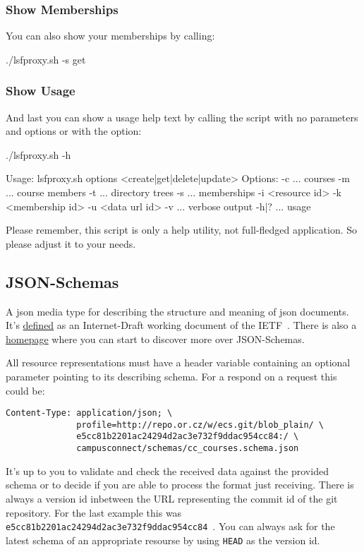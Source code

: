 \subsubsection{Show Memberships}
You can also show your memberships by calling:
\begin{code}
  ./lsfproxy.sh -s get
\end{code}

\subsubsection{Show Usage}
And last you can show a usage help text by calling the script with no
parameters and options or with the  option:
\begin{code}
  ./lsfproxy.sh -h

  Usage: lsfproxy.sh options <create|get|delete|update>
  Options:
    -c ... courses
    -m ... course members
    -t ... directory trees
    -s ... memberships
    -i <resource id>
    -k <membership id>
    -u <data url id>
    -v   ... verbose output
    -h|? ... usage
\end{code}
Please remember, this script is only a help utility, not full-fledged
application. So please adjust it to your needs. 

\hypertarget{campusconnect\_json\_schemas}{}
\subsection{JSON-Schemas}
A json media type for describing the structure and meaning of json documents.
It's \href{http://tools.ietf.org/html/draft-zyp-json-schema-03}{defined} as an
Internet-Draft working document of the IETF~. There is also a \href{http://json-schema.org}{homepage} where you can
start to discover more over JSON-Schemas.

All resource representations must have a  header variable
containing an optional parameter  pointing to its describing
schema. For a respond on a  request this could be:
\begin{verbatim}
Content-Type: application/json; \
              profile=http://repo.or.cz/w/ecs.git/blob_plain/ \
              e5cc81b2201ac24294d2ac3e732f9ddac954cc84:/ \
              campusconnect/schemas/cc_courses.schema.json
\end{verbatim}
It's up to you to validate and check the received data against the provided
schema or to decide if you are able to process the format just receiving. There
is always a version id inbetween the  URL representing the commit
id of the git repository. For the last \hv{Content-Type} example this was
\verb!e5cc81b2201ac24294d2ac3e732f9ddac954cc84!~. You can always ask for the
latest schema of an appropriate resourse by using \verb!HEAD! as the version
id.

